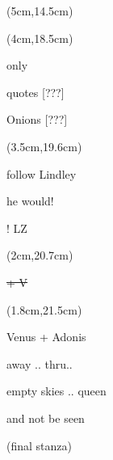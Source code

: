 \documentclass[a4paper]{article}
\begin{document}
\begin{textblock*}{3cm}(5cm,14.5cm)%
	\begin{minipage}{3cm} 
        \color{red}
        \huge \Circled{$\ast$}\par
	\end{minipage}%
\end{textblock*}%

\begin{textblock*}{3cm}(4cm,18.5cm)%
	\begin{minipage}{3cm} 
        \small
        \color{red}
        only\par
        quotes [???]\par
        Onions [???]\par
	\end{minipage}%
\end{textblock*}%

\begin{textblock*}{3cm}(3.5cm,19.6cm)%
	\begin{minipage}{3cm} 
        \small
        \color{blue}
        follow Lindley\par
        he would!\par
        ! LZ\par
	\end{minipage}%
\end{textblock*}%

\begin{textblock*}{3cm}(2cm,20.7cm)%
	\begin{minipage}{3cm} 
        \color{blue}
        \sout{+ V}
	\end{minipage}%
\end{textblock*}%

\begin{textblock*}{3cm}(1.8cm,21.5cm)%
	\begin{minipage}{3cm} 
        \small
        \color{blue}
        Venus + Adonis\par
        away .. thru..\par
        empty skies .. queen\par
        and not be seen\par
        (final stanza)\par
	\end{minipage}%
\end{textblock*}%
\end{document}
